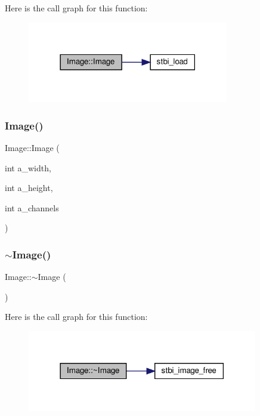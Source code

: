 Here is the call graph for this function\+:
\nopagebreak
\begin{figure}[H]
\begin{center}
\leavevmode
\includegraphics[width=249pt]{structImage_a9a7eb017b8c9babc495030a6d5e34e5a_cgraph}
\end{center}
\end{figure}
\mbox{\label{structImage_ad04e368629b03afab0737f1b523947f9}} 
\subsubsection{\texorpdfstring{Image()}{Image()}\hspace{0.1cm}{\footnotesize\ttfamily [2/2]}}
{\footnotesize\ttfamily Image\+::\+Image (\begin{DoxyParamCaption}\item[{int}]{a\+\_\+width,  }\item[{int}]{a\+\_\+height,  }\item[{int}]{a\+\_\+channels }\end{DoxyParamCaption})}

\mbox{\label{structImage_a0294f63700543e11c0f0da85601c7ae5}} 
\subsubsection{\texorpdfstring{$\sim$\+Image()}{~Image()}}
{\footnotesize\ttfamily Image\+::$\sim$\+Image (\begin{DoxyParamCaption}{ }\end{DoxyParamCaption})}

Here is the call graph for this function\+:
\nopagebreak
\begin{figure}[H]
\begin{center}
\leavevmode
\includegraphics[width=285pt]{structImage_a0294f63700543e11c0f0da85601c7ae5_cgraph}
\end{center}
\end{figure}


